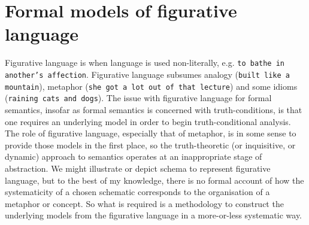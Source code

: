 \section{Formal models of figurative language}\label{sec:metaphor}

Figurative language is when language is used non-literally, e.g. \texttt{to bathe in another's affection}. Figurative language subsumes analogy (\texttt{built like a mountain}), metaphor (\texttt{she got a lot out of that lecture}) and some idioms (\texttt{raining cats and dogs}). The issue with figurative language for formal semantics, insofar as formal semantics is concerned with truth-conditions, is that one requires an underlying model in order to begin truth-conditional analysis. The role of figurative language, especially that of metaphor, is in some sense to provide those models in the first place, so the truth-theoretic (or inquisitive, or dynamic) approach to semantics operates at an inappropriate stage of abstraction. We might illustrate or depict schema to represent figurative language, but to the best of my knowledge, there is no formal account of how the systematicity of a chosen schematic corresponds to the organisation of a metaphor or concept. So what is required is a methodology to construct the underlying models from the figurative language in a more-or-less systematic way.\\

